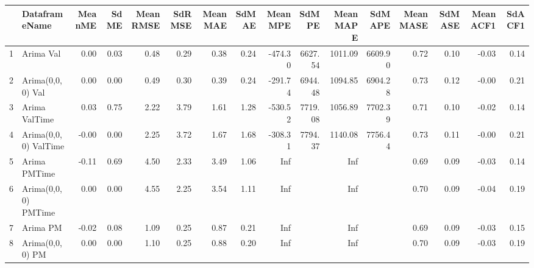 \begin{table}[ht]
\centering
\begin{tabular}{rlrrrrrrrrrrrrrr}
  \hline
 & DataframeName & MeanME & SdME & MeanRMSE & SdRMSE & MeanMAE & SdMAE & MeanMPE & SdMPE & MeanMAPE & SdMAPE & MeanMASE & SdMASE & MeanACF1 & SdACF1 \\ 
  \hline
1 & Arima Val & 0.00 & 0.03 & 0.48 & 0.29 & 0.38 & 0.24 & -474.30 & 6627.54 & 1011.09 & 6609.90 & 0.72 & 0.10 & -0.03 & 0.14 \\ 
  2 & Arima(0,0,0) Val & 0.00 & 0.00 & 0.49 & 0.30 & 0.39 & 0.24 & -291.74 & 6944.48 & 1094.85 & 6904.28 & 0.73 & 0.12 & -0.00 & 0.21 \\ 
  3 & Arima ValTime & 0.03 & 0.75 & 2.22 & 3.79 & 1.61 & 1.28 & -530.52 & 7719.08 & 1056.89 & 7702.39 & 0.71 & 0.10 & -0.02 & 0.14 \\ 
  4 & Arima(0,0,0) ValTime & -0.00 & 0.00 & 2.25 & 3.72 & 1.67 & 1.68 & -308.31 & 7794.37 & 1140.08 & 7756.44 & 0.73 & 0.11 & -0.00 & 0.21 \\ 
  5 & Arima PMTime & -0.11 & 0.69 & 4.50 & 2.33 & 3.49 & 1.06 & Inf &  & Inf &  & 0.69 & 0.09 & -0.03 & 0.14 \\ 
  6 & Arima(0,0,0) PMTime & 0.00 & 0.00 & 4.55 & 2.25 & 3.54 & 1.11 & Inf &  & Inf &  & 0.70 & 0.09 & -0.04 & 0.19 \\ 
  7 & Arima PM & -0.02 & 0.08 & 1.09 & 0.25 & 0.87 & 0.21 & Inf &  & Inf &  & 0.69 & 0.09 & -0.03 & 0.15 \\ 
  8 & Arima(0,0,0) PM & 0.00 & 0.00 & 1.10 & 0.25 & 0.88 & 0.20 & Inf &  & Inf &  & 0.70 & 0.09 & -0.03 & 0.19 \\ 
   \hline
\end{tabular}
\end{table}
